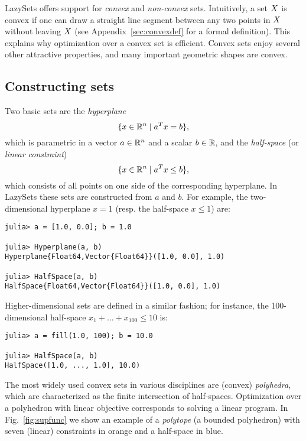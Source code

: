 LazySets offers support for \emph{convex} and \emph{non-convex} sets.
%
Intuitively, a set $X$ is convex if one can draw a straight line segment between any two points in $X$ without leaving $X$ (see Appendix~\ref{sec:convexdef} for a formal definition).
This explains why optimization over a convex set is efficient.
Convex sets enjoy several other attractive properties, and many important geometric shapes are convex.
%

\subsection{Constructing sets}

Two basic sets are the \emph{hyperplane}
%
\[
	\{x \in \mathbb{R}^n \mid a^T x = b\},
\]
%
which is parametric in a vector $a \in \mathbb{R}^n$ and a scalar $b \in \mathbb{R}$, and the \emph{half-space} (or \emph{linear constraint})
%
\[
	\{x \in \mathbb{R}^n \mid a^T x \leq b\},
\]
%
which consists of all points on one side of the corresponding hyperplane.
In LazySets these sets are constructed from $a$ and $b$. For example, the two-dimensional hyperplane $x = 1$ (resp. the half-space $x \leq 1$) are:

\begin{minipage}{\linewidth}
\vspace{-\abovedisplayskip}
\begin{lstlisting}
julia> a = [1.0, 0.0]; b = 1.0

julia> Hyperplane(a, b)
Hyperplane{Float64,Vector{Float64}}([1.0, 0.0], 1.0)

julia> HalfSpace(a, b)
HalfSpace{Float64,Vector{Float64}}([1.0, 0.0], 1.0)
\end{lstlisting}
\end{minipage}
%
Higher-dimensional sets are defined in a similar fashion; for instance, the 100-dimensional half-space $x_1 + \ldots + x_{100} \leq 10$ is:
%
\begin{minipage}{\linewidth}
\vspace{-\abovedisplayskip}
	\begin{lstlisting}
julia> a = fill(1.0, 100); b = 10.0

julia> HalfSpace(a, b)
HalfSpace([1.0, ..., 1.0], 10.0)
	\end{lstlisting}
\end{minipage}


The most widely used convex sets in various disciplines are (convex) \emph{polyhedra}, which are characterized as the finite intersection of half-spaces.
Optimization over a polyhedron with linear objective corresponds to solving a linear program.
In Fig.~\ref{fig:supfunc} we show an example of a \emph{polytope} (a bounded polyhedron) with seven (linear) constraints in orange and a half-space in blue.

